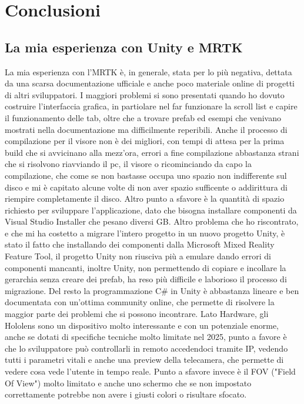 \chapter{Conclusioni}
\pagestyle{plain}

\section{La mia esperienza con Unity e MRTK}
La mia esperienza con l'MRTK è, in generale, stata per lo più negativa, dettata da una scarsa documentazione ufficiale e anche poco materiale online di progetti di altri sviluppatori. I maggiori problemi si sono presentati quando ho dovuto costruire l'interfaccia grafica, in partiolare nel far funzionare la scroll list e capire il funzionamento delle tab, oltre che a trovare prefab ed esempi che venivano mostrati nella documentazione ma difficilmente reperibili. Anche il processo di compilazione per il visore non è dei migliori, con tempi di attesa per la prima build che si avvicinano alla mezz'ora, errori a fine compilazione abbastanza strani che si risolvono riavviando il pc, il visore o ricominciando da capo la compilazione, che come se non bastasse occupa uno spazio non indifferente sul disco e mi è capitato alcune volte di non aver spazio sufficente o addirittura di riempire completamente il disco. Altro punto a sfavore è la quantità di spazio richiesto per sviluppare l'applicazione, dato che bisogna installare componenti da Visual Studio Installer che pesano diversi GB. Altro problema che ho riscontrato, e che mi ha costetto a migrare l'intero progetto in un nuovo progetto Unity, è stato il fatto che installando dei componenti dalla Microsoft Mixed Reality Feature Tool, il progetto Unity non riusciva più a emulare dando errori di componenti mancanti, inoltre Unity, non permettendo di copiare e incollare la gerarchia senza creare dei prefab, ha reso più difficile e laborioso il processo di migrazione. Del resto la programmazione C\# in Unity è abbastanza lineare e ben documentata con un'ottima community online, che permette di risolvere la maggior parte dei problemi che si possono incontrare. Lato Hardware, gli Hololens sono un dispositivo molto interessante e con un potenziale enorme, anche se dotati di specifiche tecniche molto limitate nel 2025, punto a favore è che lo sviluppatore può controllarli in remoto accedendoci tramite IP, vedendo tutti i parametri vitali e anche una preview della telecamera, che permette di vedere cosa vede l'utente in tempo reale. Punto a sfavore invece è il FOV ("Field Of View") molto limitato e anche uno schermo che se non impostato correttamente potrebbe non avere i giusti colori o risultare sfocato.
